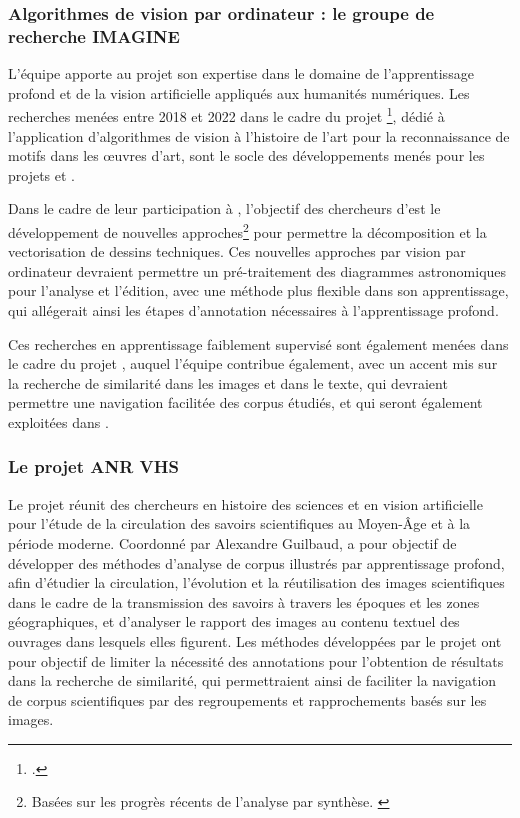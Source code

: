     \subsubsection{Algorithmes de vision par ordinateur : le groupe de recherche IMAGINE}
	L'équipe \imagine apporte au projet \eida son expertise dans le domaine de l'apprentissage profond et de la vision artificielle appliqués aux humanités numériques. Les recherches menées entre 2018 et 2022 dans le cadre du projet \enherit\footcite{EnhancingHeritageImage}, dédié à l'application d'algorithmes de vision à l'histoire de l'art pour la reconnaissance de motifs dans les œuvres d'art, sont le socle des développements menés pour les projets \eida et \vhs. 
	
	Dans le cadre de leur participation à \eida, l'objectif des chercheurs d'\imagine est le développement de nouvelles approches\footnote{Basées sur les progrès récents de l'analyse par synthèse. \cite{monnierUnsupervisedLayeredImage2021}} pour permettre la décomposition et la vectorisation de dessins techniques. Ces nouvelles approches par vision par ordinateur devraient permettre un pré-traitement des diagrammes astronomiques pour l'analyse et l'édition, avec une méthode plus flexible dans son apprentissage, qui allégerait ainsi les étapes d'annotation nécessaires à l'apprentissage profond.
	
	Ces recherches en apprentissage faiblement supervisé sont également menées dans le cadre du projet \vhs, auquel l'équipe \imagine contribue également, avec un accent mis sur la recherche de similarité dans les images et dans le texte, qui devraient permettre une navigation facilitée des corpus étudiés, et qui seront également exploitées dans \eida.

    \subsubsection{Le projet ANR VHS}
	Le projet \vhs réunit des chercheurs en histoire des sciences et en vision artificielle pour l'étude de la circulation des savoirs scientifiques au Moyen-Âge et à la période moderne. Coordonné par Alexandre Guilbaud, \vhs a pour objectif de développer des méthodes d'analyse de corpus illustrés par apprentissage profond, afin d'étudier la circulation, l'évolution et la réutilisation des images scientifiques dans le cadre de la transmission des savoirs à travers les époques et les zones géographiques, et d'analyser le rapport des images au contenu textuel des ouvrages dans lesquels elles figurent. Les méthodes développées par le projet ont pour objectif de limiter la nécessité des annotations pour l'obtention de résultats dans la recherche de similarité, qui permettraient ainsi de faciliter la navigation de corpus scientifiques par des regroupements et rapprochements basés sur les images.
	
